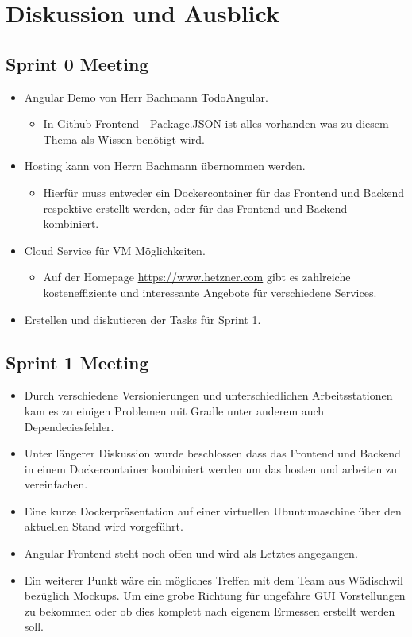 \documentclass[a4paper]{article}
\begin{document}
	\section{Diskussion und Ausblick}
	
	\subsection{Sprint 0 Meeting}
	\begin{itemize}
		\item Angular Demo von  Herr Bachmann TodoAngular.
		\begin{itemize}
			\item In Github Frontend - Package.JSON ist alles vorhanden was zu diesem Thema als Wissen benötigt wird.
		\end{itemize}
		\item Hosting kann von Herrn Bachmann übernommen werden.
		\begin{itemize}
			\item Hierfür muss entweder ein Dockercontainer für das Frontend und Backend respektive erstellt werden, oder für das Frontend und Backend kombiniert.
		\end{itemize}
		\item Cloud Service für VM Möglichkeiten.
		\begin{itemize}
			\item Auf der Homepage \url{https://www.hetzner.com} gibt es zahlreiche kosteneffiziente und interessante Angebote für verschiedene Services.
		\end{itemize}
		\item Erstellen und diskutieren der Tasks für Sprint 1.
	\end{itemize}	
	
	\subsection{Sprint 1 Meeting}
	\begin{itemize}
		\item Durch verschiedene Versionierungen und unterschiedlichen Arbeitsstationen kam es zu einigen Problemen mit Gradle unter anderem auch Dependeciesfehler.
		\item Unter längerer Diskussion wurde beschlossen dass das Frontend und Backend in einem Dockercontainer kombiniert werden um das hosten und arbeiten zu vereinfachen.
		\item Eine kurze Dockerpräsentation auf einer virtuellen Ubuntumaschine über den aktuellen Stand wird vorgeführt.
		\item Angular Frontend steht noch offen und wird als Letztes angegangen.
		\item Ein weiterer Punkt wäre ein mögliches Treffen mit dem Team aus Wädischwil bezüglich Mockups. Um eine grobe Richtung für ungefähre GUI Vorstellungen zu bekommen oder ob dies komplett nach eigenem Ermessen erstellt werden soll.
	\end{itemize}	
\end{document}
